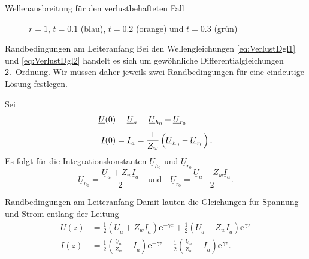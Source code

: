 \documentclass{beamer}
\begin{document}
\begin{frame}{Wellenausbreitung für den verlustbehafteten Fall}
\begin{figure}[H]
\begin{minipage}{0.32\textwidth}
        \caption*{$r=1$, $t=0.1$ (blau), $t=0.2$ (orange) und $t=0.3$ (grün)}
    \end{minipage}
\end{figure}
\end{frame}


\begin{frame}{Randbedingungen am Leiteranfang}
Bei den Wellengleichungen \eqref{eq:VerlustDgl1} und \eqref{eq:VerlustDgl2} handelt es sich um
gewöhnliche Differentialgleichungen 2.~Ordnung. Wir müssen daher jeweils zwei Randbedingungen für
eine eindeutige Lösung festlegen.

\vspace{1ex}
Sei
\begin{align*}
    \underline{U}(0) &= \underline{U}_{a} = \underline{U}_{h_{0}} + \underline{U}_{r_{0}} \\[1ex]
    \underline{I}(0) &= \underline{I}_{a} = \frac{1}{Z_{w}}
    \left(
    \vphantom{\sqrt{1}{Z_{w}}}
    \underline{U}_{h_{0}} - \underline{U}_{r_{0}} \right).
\end{align*}
Es folgt für die Integrationskonstanten $\underline{U}_{h_{0}}$ und $\underline{U}_{r_{0}}$
\[ \underline{U}_{h_{0}} = \frac{\underline{U}_{a} + Z_{w} \underline{I}_{a}}{2}
\quad \text{und} \quad
\underline{U}_{r_{0}} = \frac{\underline{U}_{a} - Z_{w} \underline{I}_{a}}{2}. \]
\end{frame}


\begin{frame}{Randbedingungen am Leiteranfang}
Damit lauten die Gleichungen für Spannung und Strom entlang der Leitung
\begin{align}
    \underline{U}(z) &=
    \frac{1}{2} \left( \underline{U}_{a} + Z_{w} \underline{I}_{a} \right) \mathbf{e}^{- \gamma z}
    +
    \frac{1}{2} \left( \underline{U}_{a} - Z_{w} \underline{I}_{a} \right) \mathbf{e}^{\gamma z} \label{eq:UxA}
    \\[1ex]
    \underline{I}(z) &=
    \frac{1}{2} \left( \frac{\underline{U}_{a}}{Z_{w}} + \underline{I}_{a} \right) \mathbf{e}^{- \gamma z}
    -
    \frac{1}{2} \left( \frac{\underline{U}_{a}}{Z_{w}} - \underline{I}_{a} \right) \mathbf{e}^{\gamma z}
    \label{eq:IxA}
    .
\end{align}
\end{frame}
\end{document}

